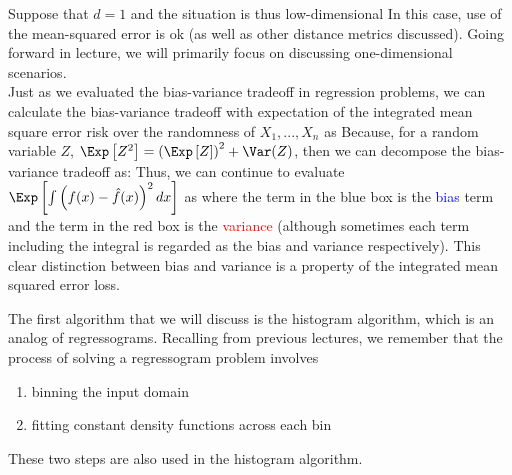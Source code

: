 Suppose that $d=1$ and the situation is thus low-dimensional In this case, use of the mean-squared error is ok (as well as other distance metrics discussed). Going forward in lecture, we will primarily focus on discussing one-dimensional scenarios.\\

Just as we evaluated the bias-variance tradeoff in regression problems, we can calculate the bias-variance tradeoff with expectation of the integrated mean square error risk over the randomness of $X_1, ..., X_n$ as
Because, for a random variable $Z$, $\Exp\left[Z^2\right] = \left(\Exp\left[Z\right]\right)^2 + \Var(Z)$, then we can decompose the bias-variance tradeoff as:
Thus, we can continue to evaluate $\Exp\left[\int \left(f(x) - \hat{f}(x)\right)^2dx\right]$ as 
where the term in the blue box is the \textcolor{blue}{bias} term and the term in the red box is the \textcolor{red}{variance} (although sometimes each term including the integral is regarded as the bias and variance respectively). This clear distinction between bias and variance is a property of the integrated mean squared error loss.

The first algorithm that we will discuss is the histogram algorithm, which is an analog of regressograms. Recalling from previous lectures, we remember that the process of solving a regressogram problem involves 
\begin{enumerate}
	\item binning the input domain
	\item fitting constant density functions across each bin
\end{enumerate}
These two steps are also used in the histogram algorithm. 

